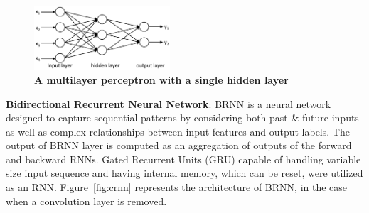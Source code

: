 \documentclass{amia}
\begin{document}
\begin{figure}[!htb]
    \centering
    \includegraphics[width=0.45\textwidth]{figures/mlp.eps}
    \caption{\textbf{A multilayer perceptron with a single hidden layer}}
    \label{fig:mlp}
\end{figure}

\textbf{Bidirectional Recurrent Neural Network}: BRNN is a neural network designed to capture sequential patterns by considering both past \& future inputs as well as complex relationships between input features and output labels.\cite{schuster1997bidirectional} The output of BRNN layer is computed as an aggregation of outputs of the forward and backward RNNs. Gated Recurrent Units (GRU)\cite{chung2014empirical} capable of handling variable size input sequence and having internal memory, which can be reset, were utilized as an RNN. Figure~\ref{fig:crnn} represents the architecture of BRNN, in the case when a convolution layer is removed.   
\end{document}
